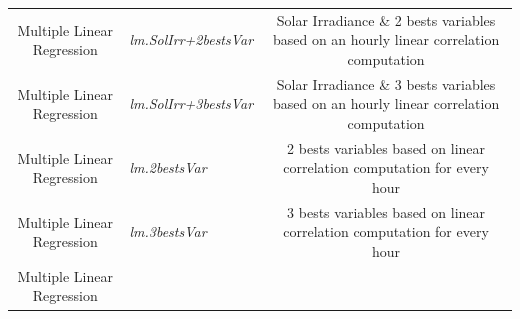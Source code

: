 \documentclass[12pt,twoside]{reedthesis}
\theoremstyle{definition}
\theoremstyle{definition}
\theoremstyle{definition}
\theoremstyle{remark}
\begin{document}
\begin{longtable}[]{@{}clc@{}}
\begin{minipage}[t]{0.18\columnwidth}
Multiple Linear Regression\strut
\end{minipage} & \begin{minipage}[t]{0.21\columnwidth}\raggedright\strut
\emph{lm.SolIrr+2bestsVar}\strut
\end{minipage} & \begin{minipage}[t]{0.52\columnwidth}\centering\strut
Solar Irradiance \& 2 bests variables based on an hourly linear
correlation computation\strut
\end{minipage}\tabularnewline
\begin{minipage}[t]{0.18\columnwidth}\centering\strut
Multiple Linear Regression\strut
\end{minipage} & \begin{minipage}[t]{0.21\columnwidth}\raggedright\strut
\emph{lm.SolIrr+3bestsVar}\strut
\end{minipage} & \begin{minipage}[t]{0.52\columnwidth}\centering\strut
Solar Irradiance \& 3 bests variables based on an hourly linear
correlation computation\strut
\end{minipage}\tabularnewline
\begin{minipage}[t]{0.18\columnwidth}\centering\strut
Multiple Linear Regression\strut
\end{minipage} & \begin{minipage}[t]{0.21\columnwidth}\raggedright\strut
\emph{lm.2bestsVar}\strut
\end{minipage} & \begin{minipage}[t]{0.52\columnwidth}\centering\strut
2 bests variables based on linear correlation computation for every
hour\strut
\end{minipage}\tabularnewline
\begin{minipage}[t]{0.18\columnwidth}\centering\strut
Multiple Linear Regression\strut
\end{minipage} & \begin{minipage}[t]{0.21\columnwidth}\raggedright\strut
\emph{lm.3bestsVar}\strut
\end{minipage} & \begin{minipage}[t]{0.52\columnwidth}\centering\strut
3 bests variables based on linear correlation computation for every
hour\strut
\end{minipage}\tabularnewline
\begin{minipage}[t]{0.18\columnwidth}\centering\strut
Multiple Linear Regression\strut
\end{minipage} & \begin{minipage}[t]{0.21\columnwidth}\raggedright\strut

\end{minipage}
\end{longtable}
\end{document}
